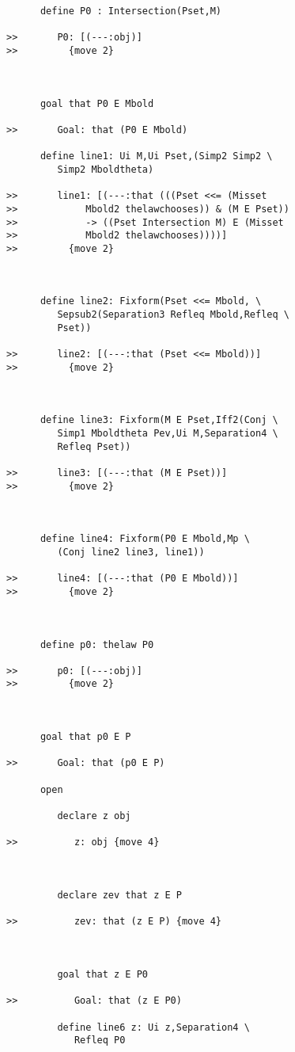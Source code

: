 \documentclass[12pt]{article}
\begin{document}
\begin{verbatim}
      define P0 : Intersection(Pset,M)

>>       P0: [(---:obj)]
>>         {move 2}



      goal that P0 E Mbold

>>       Goal: that (P0 E Mbold)

      define line1: Ui M,Ui Pset,(Simp2 Simp2 \
         Simp2 Mboldtheta)

>>       line1: [(---:that (((Pset <<= (Misset
>>            Mbold2 thelawchooses)) & (M E Pset))
>>            -> ((Pset Intersection M) E (Misset
>>            Mbold2 thelawchooses))))]
>>         {move 2}



      define line2: Fixform(Pset <<= Mbold, \
         Sepsub2(Separation3 Refleq Mbold,Refleq \
         Pset))

>>       line2: [(---:that (Pset <<= Mbold))]
>>         {move 2}



      define line3: Fixform(M E Pset,Iff2(Conj \
         Simp1 Mboldtheta Pev,Ui M,Separation4 \
         Refleq Pset))

>>       line3: [(---:that (M E Pset))]
>>         {move 2}



      define line4: Fixform(P0 E Mbold,Mp \
         (Conj line2 line3, line1))

>>       line4: [(---:that (P0 E Mbold))]
>>         {move 2}



      define p0: thelaw P0

>>       p0: [(---:obj)]
>>         {move 2}



      goal that p0 E P

>>       Goal: that (p0 E P)

      open

         declare z obj

>>          z: obj {move 4}



         declare zev that z E P

>>          zev: that (z E P) {move 4}



         goal that z E P0

>>          Goal: that (z E P0)

         define line6 z: Ui z,Separation4 \
            Refleq P0


\end{verbatim}
\end{document}
